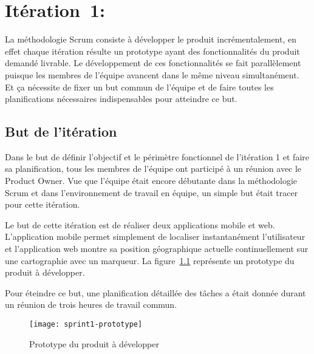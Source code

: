 \chapter[Itération~1:~(~2/22/2017~-~3/5/2017~)]{Itération~1:~\textup{}}

La méthodologie Scrum consiste à développer le produit incrémentalement, en
effet chaque itération résulte un prototype ayant des fonctionnalités du
produit demandé livrable. Le développement de ces fonctionnalités se fait
parallèlement puisque les membres de l'équipe avancent dans le même niveau
simultanément. Et ça nécessite de fixer un but commun de l'équipe et de faire
toutes les planifications nécessaires indispensables pour atteindre ce but.

\section{But de l'itération}

Dans le but de définir l'objectif et le périmètre fonctionnel de l'itération 1
et faire sa planification, tous les membres de l'équipe ont participé à un
réunion avec le Product Owner. Vue que l'équipe était encore débutante dans la
méthodologie Scrum et dans l'environnement de travail en équipe, un simple but
était tracer pour cette itération.

Le but de cette itération est de réaliser deux applications mobile et web.
L'application mobile permet simplement de localiser instantanément
l'utilisateur et l'application web montre sa position géographique actuelle
continuellement sur une cartographie avec un marqueur. La
figure~\ref{fig:sprint1-prototype} représente un prototype du produit à
développer.

Pour éteindre ce but, une planification détaillée des tâches a était donnée
durant un réunion de trois heures de travail commun.

\begin{figure}[H]
    \centering
    \texttt{[image: sprint1-prototype]}
    \caption{Prototype du produit à développer}
\label{fig:sprint1-prototype}
\end{figure}


